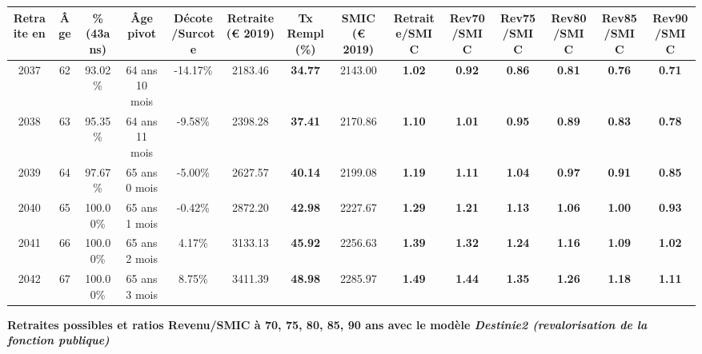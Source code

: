 \begin{adjustbox}{max width=\textwidth} 
\begin{tabular}[htb]{|c|c||c|c|c||c|c||c||c|c|c|c|c|c|} 
\hline 
 Retraite en &  Âge &  \%(43ans) &  Âge pivot &  Décote/Surcote &  Retraite (\euro{} 2019) &  Tx Rempl(\%) &  SMIC (\euro{} 2019) &  Retraite/SMIC &  Rev70/SMIC &  Rev75/SMIC &  Rev80/SMIC &  Rev85/SMIC &  Rev90/SMIC \\ 
\hline \hline 
 2037 &  62 &  93.02\% &  64 ans 10 mois &  -14.17\% &  2183.46 &  {\bf 34.77} &  2143.00 &  {\bf 1.02} &  {\bf {\color{red} 0.92}} &  {\bf {\color{red} 0.86}} &  {\bf {\color{red} 0.81}} &  {\bf {\color{red} 0.76}} &  {\bf {\color{red} 0.71}} \\ 
\hline 
 2038 &  63 &  95.35\% &  64 ans 11 mois &  -9.58\% &  2398.28 &  {\bf 37.41} &  2170.86 &  {\bf 1.10} &  {\bf 1.01} &  {\bf {\color{red} 0.95}} &  {\bf {\color{red} 0.89}} &  {\bf {\color{red} 0.83}} &  {\bf {\color{red} 0.78}} \\ 
\hline 
 2039 &  64 &  97.67\% &  65 ans 0 mois &  -5.00\% &  2627.57 &  {\bf 40.14} &  2199.08 &  {\bf 1.19} &  {\bf 1.11} &  {\bf 1.04} &  {\bf {\color{red} 0.97}} &  {\bf {\color{red} 0.91}} &  {\bf {\color{red} 0.85}} \\ 
\hline 
 2040 &  65 &  100.00\% &  65 ans 1 mois &  -0.42\% &  2872.20 &  {\bf 42.98} &  2227.67 &  {\bf 1.29} &  {\bf 1.21} &  {\bf 1.13} &  {\bf 1.06} &  {\bf {\color{red} 1.00}} &  {\bf {\color{red} 0.93}} \\ 
\hline 
 2041 &  66 &  100.00\% &  65 ans 2 mois &  4.17\% &  3133.13 &  {\bf 45.92} &  2256.63 &  {\bf 1.39} &  {\bf 1.32} &  {\bf 1.24} &  {\bf 1.16} &  {\bf 1.09} &  {\bf 1.02} \\ 
\hline 
 2042 &  67 &  100.00\% &  65 ans 3 mois &  8.75\% &  3411.39 &  {\bf 48.98} &  2285.97 &  {\bf 1.49} &  {\bf 1.44} &  {\bf 1.35} &  {\bf 1.26} &  {\bf 1.18} &  {\bf 1.11} \\ 
\hline 
\hline 
\end{tabular} 
\end{adjustbox} 
 
 \vspace{0.1cm} 
{\bf \noindent Retraites possibles et ratios Revenu/SMIC à 70, 75, 80, 85, 90 ans avec le modèle \emph{Destinie2 (revalorisation de la fonction publique)}}  
 
